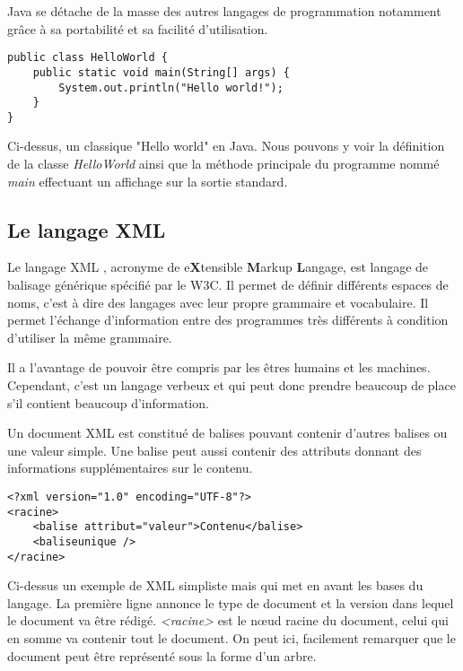 \par 
Java se détache de la masse des autres langages de programmation notamment grâce à sa portabilité et sa facilité d'utilisation.

\begin{lstlisting}[caption=Hello world en java]
public class HelloWorld {
    public static void main(String[] args) {
        System.out.println("Hello world!");
    }
}
\end{lstlisting}

\par
Ci-dessus, un classique "Hello world" en Java. Nous pouvons y voir la définition de la classe \emph{HelloWorld} ainsi que la méthode principale du programme nommé \emph{main} effectuant un affichage sur la sortie standard.



\subsection{Le langage XML}

Le langage XML \cite{xml_w3c, xml_ocr}, acronyme de e\textbf{X}tensible \textbf{M}arkup \textbf{L}angage, est langage de balisage générique spécifié par le W3C. Il permet de définir différents espaces de noms, c'est à dire des langages avec leur propre grammaire et vocabulaire. Il permet l'échange d'information entre des programmes très différents à condition d'utiliser la même grammaire.

\par
Il a l'avantage de pouvoir être compris par les êtres humains et les machines. Cependant, c'est un langage verbeux et qui peut donc prendre beaucoup de place s'il contient beaucoup d'information.

\par
Un document XML est constitué de balises pouvant contenir d'autres balises ou une valeur simple. Une balise peut aussi contenir des attributs donnant des informations supplémentaires sur le contenu.

\begin{lstlisting}[caption=Exemple d'un document XML]
<?xml version="1.0" encoding="UTF-8"?>
<racine>
    <balise attribut="valeur">Contenu</balise>
    <baliseunique />
</racine>
\end{lstlisting}

\par
Ci-dessus un exemple de XML simpliste mais qui met en avant les bases du langage. La première ligne annonce le type de document et la version dans lequel le document va être rédigé. \emph{<racine>} est le nœud racine du document, celui qui en somme va contenir tout le document. On peut ici, facilement remarquer que le document peut être représenté sous la forme d'un arbre.

